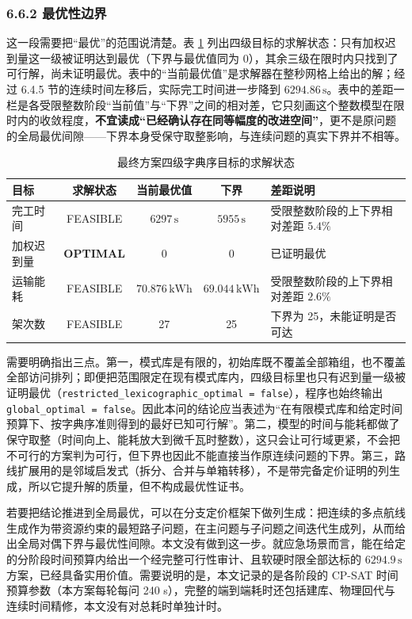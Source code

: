 \documentclass[withoutpreface,bwprint]{format}
\begin{document}
\subsubsection{6.6.2 最优性边界}
这一段需要把“最优”的范围说清楚。表 \ref{tab:q2_stages} 列出四级目标的求解状态：只有加权迟到量这一级被证明达到最优（下界与最优值同为 0），其余三级在限时内只找到了可行解，尚未证明最优。表中的“当前最优值”是求解器在整秒网格上给出的解；经过 6.4.5 节的连续时间左移后，实际完工时间进一步降到 $6294.86\,\text{s}$。表中的差距一栏是各受限整数阶段“当前值”与“下界”之间的相对差，它只刻画这个整数模型在限时内的收敛程度，\textbf{不宜读成“已经确认存在同等幅度的改进空间”}，更不是原问题的全局最优间隙——下界本身受保守取整影响，与连续问题的真实下界并不相等。

\begin{table}[H]
\centering
\small
\caption{最终方案四级字典序目标的求解状态}
\label{tab:q2_stages}
\begin{tabularx}{\textwidth}{l c c c >{\raggedright\arraybackslash}X}
\toprule
\textbf{目标} & \textbf{求解状态} & \textbf{当前最优值} & \textbf{下界} & \textbf{差距说明} \\
\midrule
完工时间 & FEASIBLE & $6297\,\text{s}$ & $5955\,\text{s}$ & 受限整数阶段的上下界相对差距 $5.4\%$ \\
加权迟到量 & \textbf{OPTIMAL} & 0 & 0 & 已证明最优 \\
运输能耗 & FEASIBLE & $70.876\,\text{kWh}$ & $69.044\,\text{kWh}$ & 受限整数阶段的上下界相对差距 $2.6\%$ \\
架次数 & FEASIBLE & 27 & 25 & 下界为 25，未能证明是否可达 \\
\bottomrule
\end{tabularx}
\end{table}

需要明确指出三点。第一，模式库是有限的，初始库既不覆盖全部箱组，也不覆盖全部访问排列；即便把范围限定在现有模式库内，四级目标里也只有迟到量一级被证明最优（\texttt{restricted\_lexicographic\_optimal = false}），程序也始终输出 \texttt{global\_optimal = false}。因此本问的结论应当表述为“在有限模式库和给定时间预算下、按字典序准则得到的最好已知可行解”。第二，模型的时间与能耗都做了保守取整（时间向上、能耗放大到微千瓦时整数），这只会让可行域更紧，不会把不可行的方案判为可行，但下界也因此不能直接当作原连续问题的下界。第三，路线扩展用的是邻域启发式（拆分、合并与单箱转移），不是带完备定价证明的列生成，所以它提升解的质量，但不构成最优性证书。

若要把结论推进到全局最优，可以在分支定价框架下做列生成：把连续的多点航线生成作为带资源约束的最短路子问题，在主问题与子问题之间迭代生成列，从而给出全局对偶下界与最优性间隙\cite{barnhart1998}。本文没有做到这一步。就应急场景而言，能在给定的分阶段时间预算内给出一个经完整可行性审计、且软硬时限全部达标的 $6294.9\,\text{s}$ 方案，已经具备实用价值。需要说明的是，本文记录的是各阶段的 CP-SAT 时间预算参数（本方案每轮每问 240 s），完整的端到端耗时还包括建库、物理回代与连续时间精修，本文没有对总耗时单独计时。
\end{document}
